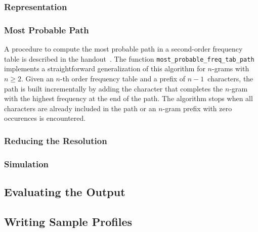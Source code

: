 \documentclass[conference]{IEEEtran}
\newcommand{\codeinline}[1]{{\fontsize{8}{0}\selectfont\texttt{#1}}}
\begin{document}
\vspace{0.5em}
\subsubsection{Representation}



\vspace{0.5em}
\subsubsection{Most Probable Path}

A procedure to compute the most probable path in a second-order frequency table is described in the handout~\cite{Bennett1976}.
The function \codeinline{most\_probable\_freq\_tab\_path} implements a straightforward generalization of this algorithm for $n$-grams with $n\geq2$.
Given an $n$-th order frequency table and a prefix of $n-1$~characters, the path is built incrementally by adding the character that completes the $n$-gram with the highest frequency at the end of the path.
The algorithm stops when all characters are already included in the path or an $n$-gram prefix with zero occurences is encountered.

\vspace{0.5em}
\subsubsection{Reducing the Resolution}


\vspace{0.5em}
\subsubsection{Simulation}


\subsection{Evaluating the Output}


\subsection{Writing Sample Profiles}
\end{document}
